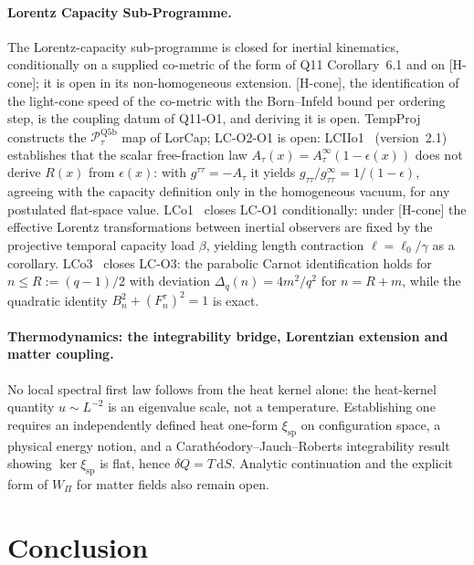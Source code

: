 \documentclass[11pt,a4paper]{article}
\begin{document}
  \paragraph{Lorentz Capacity Sub-Programme.}
    The Lorentz-capacity sub-programme is closed for inertial kinematics, conditionally on a supplied co-metric
    of the form of Q11 Corollary~6.1 and on [H-cone]; it is open in its non-homogeneous extension.
    [H-cone], the identification of the light-cone speed of the co-metric with the Born--Infeld bound per
    ordering step, is the coupling datum of Q11-O1, and deriving it is open.
    TempProj constructs the $\mathcal{P}_\tau^{\mathrm{Q5b}}$ map of LorCap;
    LC-O2-O1 is open: LCIIo1~\cite{Beau2026lco2o1} (version~2.1) establishes that the
    scalar free-fraction law $A_\tau(x) = A_\tau^\infty(1-\epsilon(x))$ does not derive
    $R(x)$ from $\epsilon(x)$: with $g^{\tau\tau} = -A_\tau$ it yields
    $g_{\tau\tau}/g_{\tau\tau}^\infty = 1/(1-\epsilon)$, agreeing with the capacity definition
    only in the homogeneous vacuum, for any postulated flat-space value.
    LCo1~\cite{Beau2026lco1} closes LC-O1 conditionally: under [H-cone] the effective Lorentz transformations
    between inertial observers are fixed by the projective temporal capacity load $\beta$,
    yielding length contraction $\ell = \ell_0/\gamma$ as a corollary.
    LCo3~\cite{Beau2026lco3} closes LC-O3: the parabolic Carnot identification holds for
    $n \leq R := (q-1)/2$ with deviation $\Delta_q(n) = 4m^2/q^2$ for $n = R+m$, while the
    quadratic identity $B_n^2 + (F_n^\tau)^2 = 1$ is exact.

  \paragraph{Thermodynamics: the integrability bridge, Lorentzian extension and matter coupling.}
    No local spectral first law follows from the heat kernel alone: the heat-kernel quantity
    $u \sim L^{-2}$ is an eigenvalue scale, not a temperature.
    Establishing one requires an independently defined heat one-form $\xi_{\mathrm{sp}}$ on configuration space,
    a physical energy notion, and a Carath\'{e}odory--Jauch--Roberts integrability result showing
    $\ker\xi_{\mathrm{sp}}$ is flat, hence $\delta Q = T\,\mathrm{d}S$.
    Analytic continuation and the explicit form of $W_\Pi$ for matter fields also remain open.

    \clearpage

  \section{Conclusion}
\end{document}
